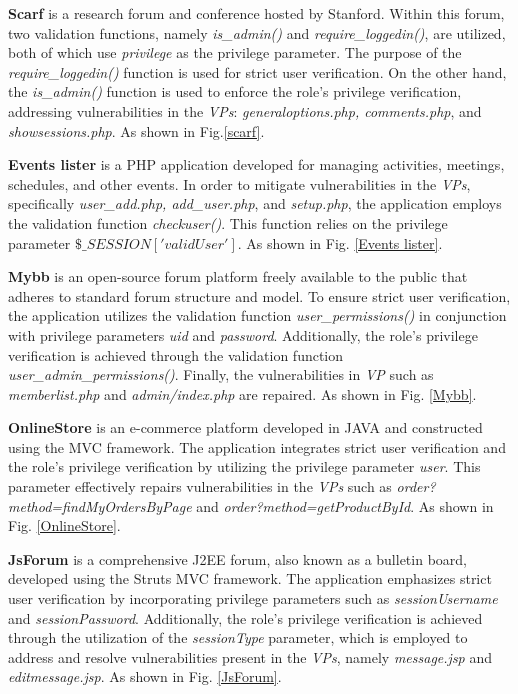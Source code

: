 \documentclass[10pt,journal,compsoc]{IEEEtran}
\begin{document}
\begin{CJK}{UTF8}{gbsn}
\textbf{Scarf} is a research forum and conference hosted by Stanford. Within this forum, two validation functions, namely \textit{is\_admin()} and \textit{require\_loggedin()}, are utilized, both of which use \textit{privilege} as the privilege parameter. The purpose of the \textit{require\_loggedin()} function is used for strict user verification. On the other hand, the \textit{is\_admin()} function is used to enforce the role's privilege verification, addressing vulnerabilities in the \textit{VPs}: \textit{generaloptions.php, comments.php}, and \textit{showsessions.php}. As shown in Fig.\ref{scarf}.

\textbf{Events lister} is a PHP application developed for managing activities, meetings, schedules, and other events. In order to mitigate vulnerabilities in the \textit{VPs}, specifically \textit{user\_add.php, add\_user.php}, and \textit{setup.php}, the application employs the validation function \textit{checkuser()}. This function relies on the privilege parameter $\$\_SESSION['validUser']$. As shown in Fig. \ref{Events lister}.

\textbf{Mybb} is an open-source forum platform freely available to the public that adheres to standard forum structure and model. To ensure strict user verification, the application utilizes the validation function \textit{user\_permissions()} in conjunction with privilege parameters \textit{uid} and \textit{password}. Additionally, the role's privilege verification is achieved through the validation function \textit{user\_admin\_permissions()}. Finally, the vulnerabilities in \textit{VP} such as \textit{memberlist.php} and \textit{admin/index.php} are repaired. As shown in Fig. \ref{Mybb}.

\textbf{OnlineStore} is an e-commerce platform developed in JAVA and constructed using the MVC framework. The application integrates strict user verification and the role's privilege verification by utilizing the privilege parameter \textit{user}. This parameter effectively repairs vulnerabilities in the \textit{VPs} such as \textit{order?method=findMyOrdersByPage} and \textit{order?method=getProductById}. As shown in Fig. \ref{OnlineStore}.

\textbf{JsForum} is a comprehensive J2EE forum, also known as a bulletin board, developed using the Struts MVC framework. The application emphasizes strict user verification by incorporating privilege parameters such as \textit{sessionUsername} and \textit{sessionPassword}. Additionally, the role's privilege verification is achieved through the utilization of the \textit{sessionType} parameter, which is employed to address and resolve vulnerabilities present in the \textit{VPs}, namely \textit{message.jsp} and \textit{editmessage.jsp}. As shown in Fig. \ref{JsForum}.




\end{CJK}
\end{document}
